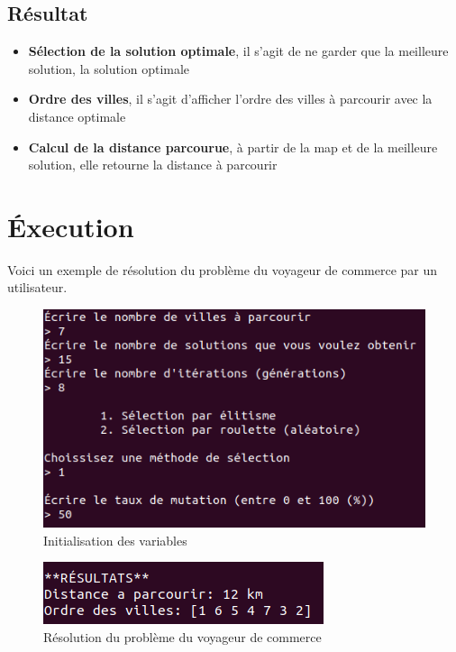 \documentclass[12pt]{report}
\begin{document}
\subsection{Résultat}
\begin{itemize}
 \item \textbf{Sélection de la solution optimale}, il s'agit de ne garder que la meilleure solution, la solution optimale
 \item \textbf{Ordre des villes}, il s'agit d'afficher l'ordre des villes à parcourir avec la distance optimale
 \item \textbf{Calcul de la distance parcourue}, à partir de la map et de la meilleure solution, elle retourne la distance à parcourir
\end{itemize}

\section{Éxecution}
Voici un exemple de résolution du problème du voyageur de commerce par un utilisateur.\\

\begin{figure}[H]
\centering
\includegraphics[scale=0.85]{img/initialization}
\caption{Initialisation des variables}
\end{figure}

\begin{figure}[H]
\centering
\includegraphics[scale=1]{img/results}
\caption{Résolution du problème du voyageur de commerce}
\end{figure}
\end{document}
